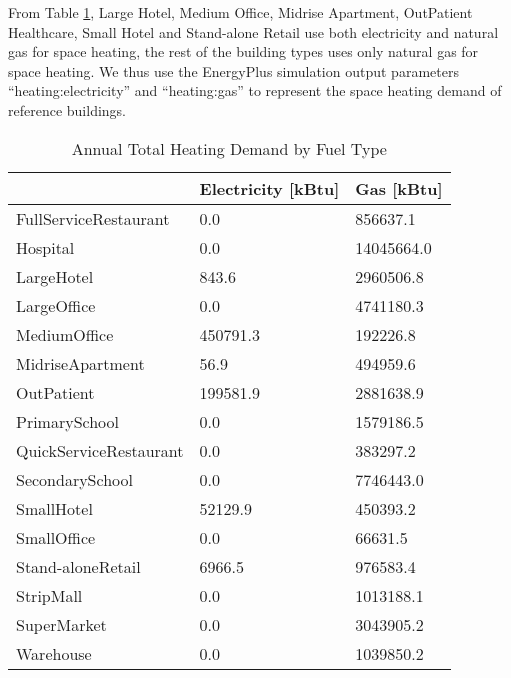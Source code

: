 \documentclass[hidelinks,12pt]{article}
\newcommand{\tref}[1]{Table \ref{#1}}
\begin{document}
From \tref{tab:heatFuel}, Large Hotel, Medium Office, Midrise
Apartment, OutPatient Healthcare, Small Hotel and Stand-alone Retail
use both electricity and natural gas for space heating, the rest of
the building types uses only natural gas for space heating. We thus
use the EnergyPlus simulation output parameters
``heating:electricity'' and ``heating:gas'' to represent the space
heating demand of reference buildings.
\begin{table}[h]
\centering
\caption{Annual Total Heating Demand by Fuel Type}
\label{tab:heatFuel}
\begin{tabular}{lll}
  \hline
                       & Electricity {[}kBtu{]} & Gas {[}kBtu{]} \\
  \hline
  \hline
FullServiceRestaurant  & 0.0                    & 856637.1       \\
Hospital               & 0.0                    & 14045664.0     \\
LargeHotel             & 843.6                  & 2960506.8      \\
LargeOffice            & 0.0                    & 4741180.3      \\
MediumOffice           & 450791.3               & 192226.8       \\
MidriseApartment       & 56.9                   & 494959.6       \\
OutPatient             & 199581.9               & 2881638.9      \\
PrimarySchool          & 0.0                    & 1579186.5      \\
QuickServiceRestaurant & 0.0                    & 383297.2       \\
SecondarySchool        & 0.0                    & 7746443.0      \\
SmallHotel             & 52129.9                & 450393.2       \\
SmallOffice            & 0.0                    & 66631.5        \\
Stand-aloneRetail      & 6966.5                 & 976583.4       \\
StripMall              & 0.0                    & 1013188.1      \\
SuperMarket            & 0.0                    & 3043905.2      \\
Warehouse              & 0.0                    & 1039850.2     \\
  \hline
\end{tabular}
\end{table}
\end{document}
